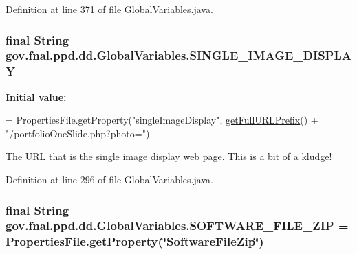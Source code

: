 Definition at line 371 of file Global\-Variables.\-java.

\hypertarget{classgov_1_1fnal_1_1ppd_1_1dd_1_1GlobalVariables_ab018dd06fadda0d1bc99e7de66894e84}{
\subsubsection[{S\-I\-N\-G\-L\-E\-\_\-\-I\-M\-A\-G\-E\-\_\-\-D\-I\-S\-P\-L\-A\-Y}]{\setlength{\rightskip}{0pt plus 5cm}final String gov.\-fnal.\-ppd.\-dd.\-Global\-Variables.\-S\-I\-N\-G\-L\-E\-\_\-\-I\-M\-A\-G\-E\-\_\-\-D\-I\-S\-P\-L\-A\-Y\hspace{0.3cm}{\ttfamily [static]}}}\label{classgov_1_1fnal_1_1ppd_1_1dd_1_1GlobalVariables_ab018dd06fadda0d1bc99e7de66894e84}
{\bfseries Initial value\-:}
\begin{DoxyCode}
= PropertiesFile.getProperty(\textcolor{stringliteral}{"singleImageDisplay"},
            \hyperlink{classgov_1_1fnal_1_1ppd_1_1dd_1_1GlobalVariables_ab7639ebfcc296b374593079a06026c65}{getFullURLPrefix}() + \textcolor{stringliteral}{"/portfolioOneSlide.php?photo="})
\end{DoxyCode}
The U\-R\-L that is the single image display web page. This is a bit of a kludge! 

Definition at line 296 of file Global\-Variables.\-java.

\hypertarget{classgov_1_1fnal_1_1ppd_1_1dd_1_1GlobalVariables_ab8e56e6480b2c30248d2e20aee782cb4}{
\subsubsection[{S\-O\-F\-T\-W\-A\-R\-E\-\_\-\-F\-I\-L\-E\-\_\-\-Z\-I\-P}]{\setlength{\rightskip}{0pt plus 5cm}final String gov.\-fnal.\-ppd.\-dd.\-Global\-Variables.\-S\-O\-F\-T\-W\-A\-R\-E\-\_\-\-F\-I\-L\-E\-\_\-\-Z\-I\-P = {\bf Properties\-File.\-get\-Property}(\char`\"{}Software\-File\-Zip\char`\"{})\hspace{0.3cm}{\ttfamily [static]}}}\label{classgov_1_1fnal_1_1ppd_1_1dd_1_1GlobalVariables_ab8e56e6480b2c30248d2e20aee782cb4}


